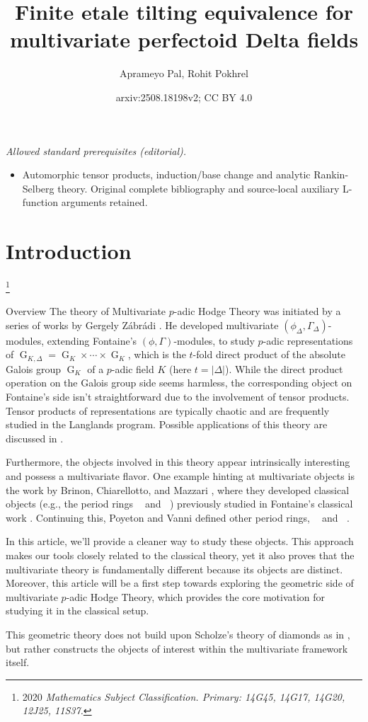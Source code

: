 \documentclass[12pts,a4paper]{amsart}
\title{Finite etale tilting equivalence for multivariate perfectoid Delta fields}
\author{Aprameyo Pal, Rohit Pokhrel}
\date{arxiv:2508.18198v2; CC BY 4.0}
\DeclareMathOperator{\G}{G}
\DeclareMathOperator{\Bdr}{B_{dR,\Delta}}
\DeclareMathOperator{\BHT}{B_{HT,\Delta}}
\DeclareMathOperator{\Bcris}{B_{cris,\Delta}}
\DeclareMathOperator{\Bst}{B_{st,\Delta}}
\begin{document}
\maketitle
\noindent\textit{Allowed standard prerequisites (editorial).}\begin{itemize}
\item Automorphic tensor products, induction/base change and analytic Rankin-Selberg theory. Original complete bibliography and source-local auxiliary L-function arguments retained.
\end{itemize}\medskip
\section{Introduction}
\footnote{2020 \it Mathematics Subject Classification. 
\rm Primary: 14G45, 14G17, 14G20, 12J25, 11S37.}

\begin{subsection}{Overview}
   The theory of Multivariate $p$-adic Hodge Theory was initiated by a series of works by Gergely Zábrádi \cite{Zab,Zab2}. He developed multivariate $(\phi_\Delta,\Gamma_\Delta)$-modules, extending Fontaine's $(\phi,\Gamma)$-modules, to study $p$-adic representations of $\G_{K,\Delta}=\G_K\times\cdots\times \G_K$, which is the $t$-fold direct product of the absolute Galois group $\G_K$ of a $p$-adic field $K$ (here $t=|\Delta|$). While the direct product operation on the Galois group side seems harmless, the corresponding object on Fontaine's side isn't straightforward due to the involvement of tensor products. Tensor products of representations are typically chaotic and are frequently studied in the Langlands program. Possible applications of this theory are discussed in \cite{Pal-Zab,CarKedZab}.

  Furthermore, the objects involved in this theory appear intrinsically interesting and possess a multivariate flavor. One example hinting at multivariate objects is the work by Brinon, Chiarellotto, and Mazzari \cite{Bri}, where they developed classical objects (e.g., the period rings $\Bdr$ and $\BHT$) previously studied in Fontaine's classical work \cite{Fontaine}. Continuing this, Poyeton and Vanni \cite{poyeton} defined other period rings, $\Bcris$ and $\Bst$.

  In this article, we'll provide a cleaner way to study these objects. This approach makes our tools closely related to the classical theory, yet it also proves that the multivariate theory is fundamentally different because its objects are distinct. Moreover, this article will be a first step towards exploring the geometric side of multivariate $p$-adic Hodge Theory, which provides the core motivation for studying it in the classical setup.

  This geometric theory does not build upon Scholze's theory of diamonds as in \cite{CarKedZab}, but rather constructs the objects of interest within the multivariate framework itself.
\end{subsection}
\end{document}
